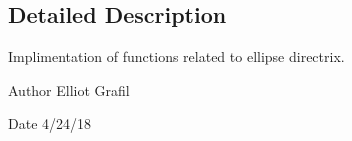 \subsection{Detailed Description}
Implimentation of functions related to ellipse directrix. 

\begin{DoxyAuthor}{Author}
Elliot Grafil 
\end{DoxyAuthor}
\begin{DoxyDate}{Date}
4/24/18 
\end{DoxyDate}
